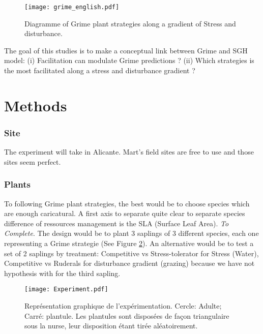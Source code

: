 \documentclass[12pt]{article} %
\begin{document}
\begin{figure}
\begin{center}
\texttt{[image: grime\_english.pdf]}
\end{center}
\caption{Diagramme of Grime plant strategies along a gradient of Stress and disturbance.\label{Grime}}
\end{figure}



The goal of this studies is to make a conceptual link between Grime and SGH model: (i) Facilitation can modulate Grime predictions ? (ii) Which strategies is the most facilitated along a stress and disturbance gradient ?

\part{Methods}

\section{Site}

The experiment will take in Alicante. Mart's field sites are free to use and those sites seem perfect.

\section{Plants}

To following Grime plant strategies, the best would be to choose species which are enough caricatural. A first axis to separate  quite clear to separate species  difference of ressources management is the SLA (Surface Leaf Area). \textit{To Complete}.
The design would be to plant 3 saplings of 3 different species, each one representing a Grime strategie (See Figure \ref{exp}). An alternative would be to test a set of 2 saplings by treatment: Competitive vs Stress-tolerator for Stress (Water), Competitive vs Ruderals for disturbance gradient (grazing) because we have not hypothesis with for the third sapling.

\begin{figure}
\begin{center}
\texttt{[image: Experiment.pdf]}
\end{center}
\caption{Représentation graphique de l'expérimentation. Cercle: Adulte; Carré: plantule. Les plantules sont disposées de façon triangulaire sous la nurse, leur disposition étant tirée aléatoirement. \label{exp}}
\end{figure}
\end{document}
